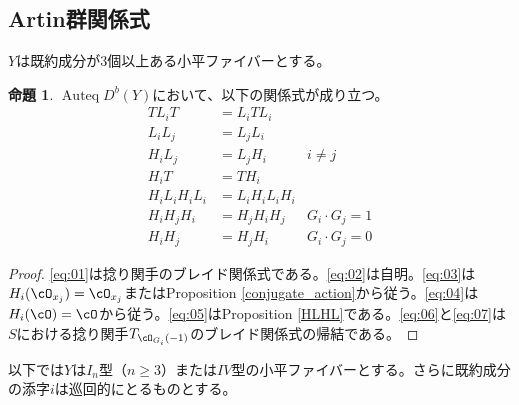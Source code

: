 \documentclass[uplatex, a4paper, dvipdfmx]{jsarticle}
\theoremstyle{definition}
\newtheorem{proposition}[theorem]{命題}
\DeclareMathOperator{\Auteq}{\mathrm{Auteq}}
\begin{document}
\subsection{Artin群関係式}
$Y$は既約成分が$3$個以上ある小平ファイバーとする。
\begin{proposition}\label{Artin_relation}
    $\Auteq D^b(Y)$において、以下の関係式が成り立つ。
    \begin{align}
        TL_iT        & = L_iTL_i \label{eq:01}                                        \\
        L_iL_j       & = L_jL_i \label{eq:02}                                         \\
        H_iL_j       & = L_jH_i                     & i \neq j \label{eq:03}          \\
        H_iT         & = TH_i \label{eq:04}                                           \\
        H_iL_iH_iL_i & = L_iH_iL_iH_i \label{eq:05}                                   \\
        H_iH_{j}H_i  & = H_{j}H_iH_{j}              & G_i \cdot G_j = 1 \label{eq:06} \\
        H_iH_j       & = H_jH_i                     & G_i \cdot G_j = 0 \label{eq:07}
    \end{align}
\end{proposition}
\begin{proof}
    \eqref{eq:01}は捻り関手のブレイド関係式である。\eqref{eq:02}は自明。\eqref{eq:03}は$H_i(\cO_{x_j}) = \cO_{x_j}$またはProposition \ref{conjugate_action}から従う。\eqref{eq:04}は$H_i(\cO) = \cO$から従う。\eqref{eq:05}はProposition \ref{HLHL}である。\eqref{eq:06}と\eqref{eq:07}は$S$における捻り関手$T_{\cO_{G_i}(-1)}$のブレイド関係式の帰結である。
\end{proof}
以下では$Y$は$I_n$型（$n \geq 3$）または$IV$型の小平ファイバーとする。さらに既約成分の添字$i$は巡回的にとるものとする。
\end{document}
